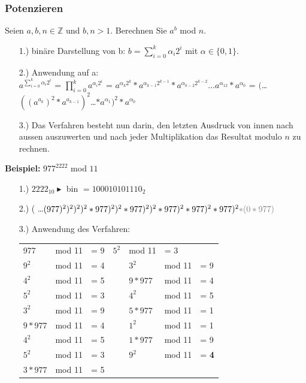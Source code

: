 \documentclass[landscape,twocolumn,a4paper]{article}
\newcommand{\ZN}{\mathbb{Z}} %
\begin{document}
\subsubsection{Potenzieren}
Seien $a,b,n \in \ZN$ und $b,n > 1$. Berechnen Sie $a^b$ mod $n$.
\begin{itemize}
	\item[1.)] binäre Darstellung von b: $b=\sum_{i=0}^k \alpha_i2^i$ mit $\alpha \in \{0,1\}$.
	\item[2.)] Anwendung auf a: \\
		$a^{\sum_{i=0}^k \alpha_i2^i}$ = $\prod_{i=0}^{k} a^{\alpha_i2^i}$ = $a^{\alpha_k2^k}*a^{\alpha_{k-1}2^{k-1}}*a^{\alpha_{k-2}2^{k-2}} \dots  a^{\alpha_12}*a^{\alpha_0}$ = $($\dots$((a^{a_k})^2*a^{a_{k-1}})^2$\dots$*a^{\alpha_1})^2*a^{\alpha_0}$
	\item[3.)] Das Verfahren besteht nun darin, den letzten Ausdruck von innen nach aussen auszuwerten und nach jeder Multiplikation das Resultat modulo $n$ zu rechnen.
\end{itemize}
\textbf{Beispiel:}  $977^{2222}$ mod $11$
\begin{itemize}
	\item[1.)] $2222_{10} \blacktriangleright$ bin $= 100010101110_2$
	\item[2.)] ( \dots $ (977)^2)^2)^2)^2*977)^2)^2*977)^2)^2*977)^2*977)^2*977)^2 {\color{gray} *(0*977)}$
	\item[3.)] Anwendung des Verfahren: \\
	\begin{tabular}{l l l p{3cm} l l l}
	 977 & mod 11 & = 9     & $5^2$ & mod 11 & = 3 \\
	 $9^2$ & mod 11 & = 4   && $3^2$ & mod 11 & = 9 \\
	 $4^2$ & mod 11 & = 5   && $9*977$ & mod 11 & = 4 \\
	 $5^2$ & mod 11 & = 3   && $4^2$ & mod 11 & = 5 \\
	 $3^2$ & mod 11 & = 9   && $5*977$ & mod 11 & = 1 \\
	 $9*977$ & mod 11 & = 4 && $1^2$ & mod 11 & = 1 \\
	 $4^2$ & mod 11 & = 5   && $1*977$ & mod 11 & = 9 \\
	 $5^2$ & mod 11 & = 3   && $9^2$ & mod 11 & = \textbf{4} \\
	 $3*977$ & mod 11 & = 5\\

	\end{tabular}
\end{itemize}
\end{document}
